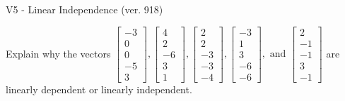 \begin{exercise}
  \begin{exerciseTitle}V5 - Linear Independence (ver. 918)\end{exerciseTitle}
  \begin{exerciseStatement}
    Explain why the vectors \(\left[\begin{array}{r}
-3 \\
0 \\
0 \\
-5 \\
3
\end{array}\right] , \left[\begin{array}{r}
4 \\
2 \\
-6 \\
3 \\
1
\end{array}\right] , \left[\begin{array}{r}
2 \\
2 \\
-3 \\
-3 \\
-4
\end{array}\right] , \left[\begin{array}{r}
-3 \\
1 \\
3 \\
-6 \\
-6
\end{array}\right] , \text{ and } \left[\begin{array}{r}
2 \\
-1 \\
-1 \\
3 \\
-1
\end{array}\right]\) are linearly dependent or linearly independent.	



\end{exerciseStatement}
\end{exercise}
